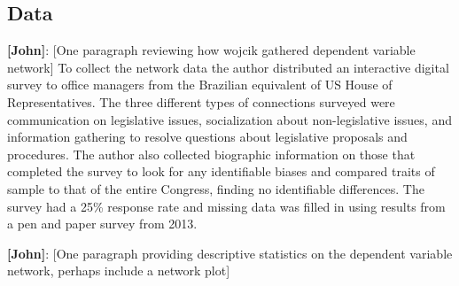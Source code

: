 \documentclass[fleqn,12pt]{wlscirep}
\begin{document}
\subsection{Data}

{\bf [John]}: [One paragraph reviewing how wojcik gathered dependent variable network] To collect the network data the author distributed an interactive digital survey to office managers from the Brazilian equivalent of US House of Representatives. The three different types of connections surveyed were communication on legislative issues, socialization about non-legislative issues, and information gathering to resolve questions about legislative proposals and procedures. The author also collected biographic information on those that completed the survey to look for any identifiable biases and compared traits of sample to that of the entire Congress, finding no identifiable differences. The survey had a 25\% response rate and missing data was filled in using results from a pen and paper survey from 2013.

{\bf [John]}: [One paragraph providing descriptive statistics on the dependent variable network, perhaps include a network plot]
\end{document}

